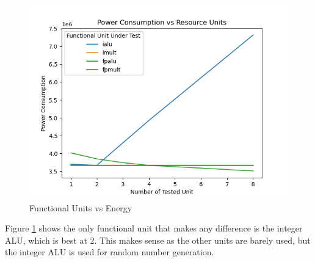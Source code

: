 \documentclass{article}
\begin{document}
\begin{multicols}{2}
  \begin{figure}[H]
    \centering
    \includegraphics[width=\linewidth]{./assets/units_vs_energy.png}
    \caption{Functional Units vs Energy}
    \label{fig:units_vs_energy}
  \end{figure}

  Figure \ref{fig:units_vs_energy} shows the only functional unit that makes any difference is the integer ALU, which is best at 2. This makes sense as the other units are barely used, but the integer ALU is used for random number generation.

\end{multicols}
\end{document}
